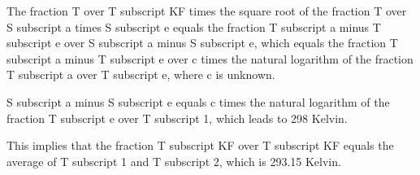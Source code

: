 The fraction T over T subscript KF times the square root of the fraction T over S subscript a times S subscript e equals the fraction T subscript a minus T subscript e over S subscript a minus S subscript e, which equals the fraction T subscript a minus T subscript e over c times the natural logarithm of the fraction T subscript a over T subscript e, where c is unknown.

S subscript a minus S subscript e equals c times the natural logarithm of the fraction T subscript e over T subscript 1, which leads to 298 Kelvin.

This implies that the fraction T subscript KF over T subscript KF equals the average of T subscript 1 and T subscript 2, which is 293.15 Kelvin.